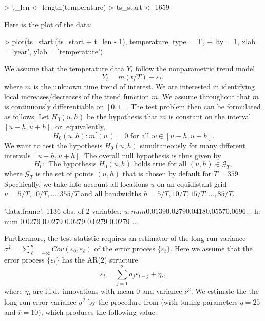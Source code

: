 \documentclass[a4paper]{scrartcl}
\begin{document}
\begin{Schunk}
\begin{Sinput}
> t_len    <- length(temperature)
> ts_start <- 1659
\end{Sinput}
\end{Schunk}

Here is the plot of the data:

\begin{Schunk}
\begin{Sinput}
> plot(ts_start:(ts_start + t_len - 1), temperature, type = 'l',
+      lty = 1, xlab = 'year', ylab = 'temperature')
\end{Sinput}
\end{Schunk}

We assume that the temperature data $Y_{t}$ follow the nonparametric trend model
\begin{equation*}
Y_{t} = m(t/T) + \varepsilon_t,
\end{equation*}
where $m$ is the unknown time trend of interest. We are interested in identifying local increases/decreases of the trend function $m$. We assume throughout that $m$ is continuously differentiable on $[0,1]$. The test problem then can be formulated as follows: Let $H_0(u,h)$ be the hypothesis that $m$ is constant on the interval $[u-h,u+h]$, or, equivalently,
\[ H_0(u,h): m^\prime(w) = 0 \text { for all } w \in [u-h,u+h]. \]
We want to test the hypothesis $H_0(u,h)$ simultaneously for many different intervals $[u-h,u+h]$. The overall null hypothesis is thus given by
\[ H_0: \text{ The hypothesis } H_0(u,h) \text{ holds true for all } (u,h) \in \mathcal{G}_T, \]
where $\mathcal{G}_T$ is the set of points $(u,h)$ that is chosen by default for $T = 359$. Specifically, we take into account all locations $u$ on an equidistant grid \linebreak $u = 5/T, 10/T, \ldots, 355/T$ and all bandwidths $h=5/T, 10/T, 15/T,\ldots, 85/T$.

\begin{Schunk}
\begin{Soutput}
'data.frame':	1136 obs. of  2 variables:
 $ u: num  0.0139 0.0279 0.0418 0.0557 0.0696 ...
 $ h: num  0.0279 0.0279 0.0279 0.0279 0.0279 ...
\end{Soutput}
\end{Schunk}

Furthermore, the test statistic requires an estimator of the long-run variance \linebreak $\sigma^2 = \sum_{\ell=-\infty}^{\infty} Cov(\varepsilon_0, \varepsilon_{\ell})$ of the error process $\{ \varepsilon_t \}$. Here we assume that the error process $\{ \varepsilon_t \}$ has the AR($2$) structure 
\begin{equation*}
\varepsilon_t = \sum_{j=1}^{2} a_j \varepsilon_{t-j} + \eta_t,
\end{equation*}
where $\eta_t$ are i.i.d.\ innovations with mean $0$ and variance $\nu^2$. We estimate the the long-run error variance $\sigma^2$ by the procedure from \cite{KhismatullinaVogt2020a} (with tuning parameters $q = 25$ and $ = 10$), which produces the following value:
\end{document}
